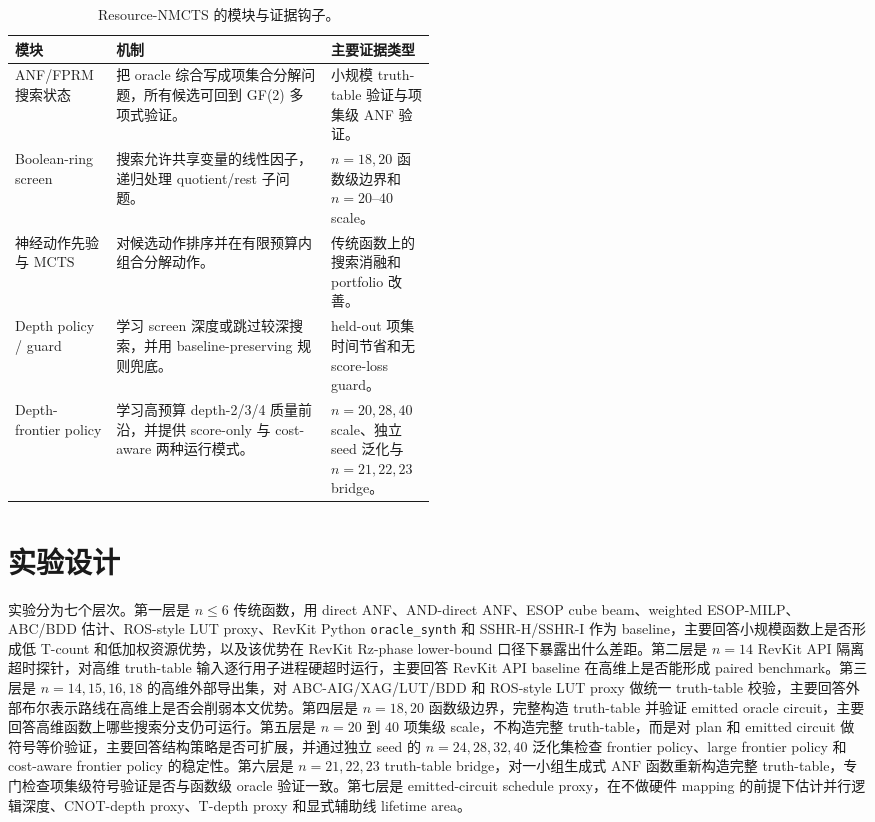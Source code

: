 \documentclass[UTF8,fontset=macnew,11pt]{ctexart}
\newcommand{\method}{Resource-NMCTS}
\newcommand{\anf}{\ensuremath{\mathrm{ANF}}}
\newcommand{\mcts}{\ensuremath{\mathrm{MCTS}}}
\newcommand{\ttable}{truth-table}
\begin{document}
\begin{table}[H]
\centering
\small
\caption{\method{} 的模块与证据钩子。}
\label{tab:modules}
\begin{tabularx}{\linewidth}{>{\raggedright\arraybackslash}p{0.24\linewidth}>{\raggedright\arraybackslash}X>{\raggedright\arraybackslash}p{0.25\linewidth}}
\toprule
模块 & 机制 & 主要证据类型 \\
\midrule
ANF/FPRM 搜索状态 & 把 oracle 综合写成项集合分解问题，所有候选可回到 GF(2) 多项式验证。 & 小规模 truth-table 验证与项集级 ANF 验证。 \\
Boolean-ring screen & 搜索允许共享变量的线性因子，递归处理 quotient/rest 子问题。 & $n=18,20$ 函数级边界和 $n=20$--$40$ scale。 \\
神经动作先验与 \mcts{} & 对候选动作排序并在有限预算内组合分解动作。 & 传统函数上的搜索消融和 portfolio 改善。 \\
Depth policy / guard & 学习 screen 深度或跳过较深搜索，并用 baseline-preserving 规则兜底。 & held-out 项集时间节省和无 score-loss guard。 \\
Depth-frontier policy & 学习高预算 depth-2/3/4 质量前沿，并提供 score-only 与 cost-aware 两种运行模式。 & $n=20,28,40$ scale、独立 seed 泛化与 $n=21,22,23$ bridge。 \\
\bottomrule
\end{tabularx}
\end{table}

\section{实验设计}

实验分为七个层次。第一层是 $n\leq6$ 传统函数，用 direct ANF、AND-direct ANF、ESOP cube beam、weighted ESOP-MILP、ABC/BDD 估计、ROS-style LUT proxy、RevKit Python \texttt{oracle\_synth} 和 SSHR-H/SSHR-I 作为 baseline，主要回答小规模函数上是否形成低 T-count 和低加权资源优势，以及该优势在 RevKit Rz-phase lower-bound 口径下暴露出什么差距。第二层是 $n=14$ RevKit API 隔离超时探针，对高维 truth-table 输入逐行用子进程硬超时运行，主要回答 RevKit API baseline 在高维上是否能形成 paired benchmark。第三层是 $n=14,15,16,18$ 的高维外部导出集，对 ABC-AIG/XAG/LUT/BDD 和 ROS-style LUT proxy 做统一 truth-table 校验，主要回答外部布尔表示路线在高维上是否会削弱本文优势。第四层是 $n=18,20$ 函数级边界，完整构造 \ttable{} 并验证 emitted oracle circuit，主要回答高维函数上哪些搜索分支仍可运行。第五层是 $n=20$ 到 $40$ 项集级 scale，不构造完整 \ttable{}，而是对 plan 和 emitted circuit 做符号等价验证，主要回答结构策略是否可扩展，并通过独立 seed 的 $n=24,28,32,40$ 泛化集检查 frontier policy、large frontier policy 和 cost-aware frontier policy 的稳定性。第六层是 $n=21,22,23$ truth-table bridge，对一小组生成式 \anf{} 函数重新构造完整 \ttable{}，专门检查项集级符号验证是否与函数级 oracle 验证一致。第七层是 emitted-circuit schedule proxy，在不做硬件 mapping 的前提下估计并行逻辑深度、CNOT-depth proxy、T-depth proxy 和显式辅助线 lifetime area。
\end{document}
